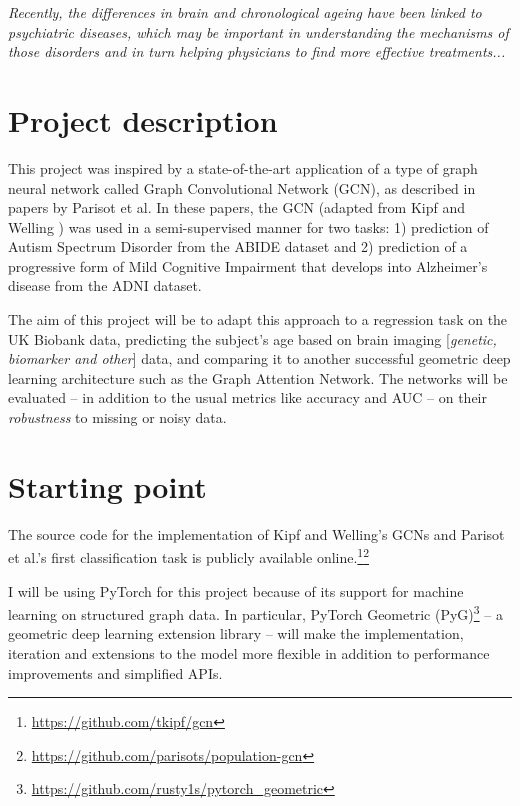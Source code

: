 \documentclass[12pt,a4paper,twoside]{article}
\begin{document}
\textit{Recently, the differences in brain and chronological ageing have been linked to psychiatric diseases,\cite{kaufmann2019} which may be important in understanding the mechanisms of those disorders and in turn helping physicians to find more effective treatments...}

\section*{Project description}
This project was inspired by a state-of-the-art application of a type of graph neural network called Graph Convolutional Network (GCN), as described in papers by Parisot et al. \cite{parisot2017spectral, parisot2018disease} In these papers, the GCN (adapted from Kipf and Welling \cite{kipf2017semi}) was used in a semi-supervised manner for two tasks: 1) prediction of Autism Spectrum Disorder from the ABIDE dataset and 2) prediction of a progressive form of Mild Cognitive Impairment that develops into Alzheimer's disease from the ADNI dataset.

The aim of this project will be to adapt this approach to a regression task on the UK Biobank data, predicting the subject's age based on brain imaging [\textit{genetic, biomarker and other}] data, and comparing it to another successful geometric deep learning architecture such as the Graph Attention Network. The networks will be evaluated – in addition to the usual metrics like accuracy and AUC – on their \textit{robustness} to missing or noisy data.


\section*{Starting point}

The source code for the implementation of Kipf and Welling's \cite{kipf2017semi} GCNs and Parisot et al.'s \cite{parisot2018disease} first classification task is publicly available online.\footnote{\url{https://github.com/tkipf/gcn}}\footnote{\url{https://github.com/parisots/population-gcn}}

I will be using PyTorch for this project because of its support for machine learning on structured graph data. In particular, PyTorch Geometric (PyG)\footnote{\url{https://github.com/rusty1s/pytorch_geometric}} – a geometric deep learning extension library – will make the implementation, iteration and extensions to the model more flexible in addition to performance improvements and simplified APIs.
\end{document}
